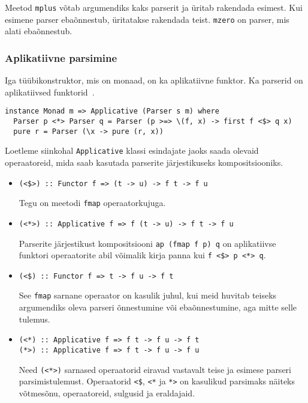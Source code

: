 \documentclass[12pt]{article}
\begin{document}
        Meetod \verb!mplus! võtab argumendiks kaks parserit ja üritab rakendada esimest. Kui esimene parser ebaõnnestub, üritatakse rakendada teist. \verb!mzero! on parser, mis alati ebaõnnestub.
      \subsubsection{Aplikatiivne parsimine}\label{appars}
        Iga tüübikonstruktor, mis on monaad, on ka aplikatiivne funktor. Ka parserid on aplikatiivsed funktorid~\cite{App}.

        \begin{verbatim}instance Monad m => Applicative (Parser s m) where
  Parser p <*> Parser q = Parser (p >=> \(f, x) -> first f <$> q x)
  pure r = Parser (\x -> pure (r, x))\end{verbatim}

        Loetleme siinkohal \verb!Applicative! klassi esindajate jaoks saada olevaid operaatoreid, mida saab kasutada parserite järjestikuseks kompositsiooniks.

        \begin{itemize}
          \item
            \begin{verbatim}(<$>) :: Functor f => (t -> u) -> f t -> f u\end{verbatim}

            Tegu on meetodi \verb!fmap! operaatorkujuga.
          \item
            \begin{verbatim}(<*>) :: Applicative f => f (t -> u) -> f t -> f u\end{verbatim}

            Parserite järjestikust kompositsiooni \verb!ap (fmap f p) q! on aplikatiivse funktori operaatorite abil võimalik kirja panna kui \verb!f <$> p <*> q!.
          \item
            \begin{verbatim}(<$) :: Functor f => t -> f u -> f t\end{verbatim}

            See \verb!fmap! sarnane operaator on kasulik juhul, kui meid huvitab teiseks argumendiks oleva parseri õnnestumine või ebaõnnestumine, aga mitte selle tulemus.
          \item
            \begin{verbatim}(<*) :: Applicative f => f t -> f u -> f t
(*>) :: Applicative f => f t -> f u -> f u\end{verbatim}

            Need \verb!(<*>)! sarnased operaatorid eiravad vastavalt teise ja esimese parseri parsimistulemust. Operaatorid \verb!<$!, \verb!<*! ja \verb!*>! on kasulikud parsimaks näiteks võtmesõnu, operaatoreid, sulgusid ja eraldajaid.
        \end{itemize}
\end{document}
